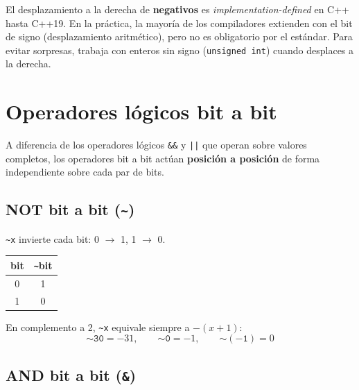 \documentclass[12pt, oneside]{article}
\begin{document}
\begin{advertencia}
  El desplazamiento a la derecha de \textbf{negativos} es
  \textit{implementation-defined} en C++ hasta C++19.
  En la práctica, la mayoría de los compiladores extienden con el bit de
  signo (desplazamiento aritmético), pero no es obligatorio por el estándar.
  Para evitar sorpresas, trabaja con enteros sin signo (\texttt{unsigned int})
  cuando desplaces a la derecha.
\end{advertencia}

\section{Operadores lógicos bit a bit}

A diferencia de los operadores lógicos \texttt{\&\&} y \texttt{||} que
operan sobre valores completos, los operadores bit a bit actúan
\textbf{posición a posición} de forma independiente sobre cada par de bits.

\subsection{NOT bit a bit (\texttt{\textasciitilde})}

\texttt{\textasciitilde{}x} invierte cada bit: 0 $\to$ 1, 1 $\to$ 0.

\begin{center}
\begin{tabular}{cc}
  \toprule
  bit & \texttt{\textasciitilde}bit \\
  \midrule
  0 & 1 \\
  1 & 0 \\
  \bottomrule
\end{tabular}
\end{center}

\begin{recuerda}
  En complemento a 2, \texttt{\textasciitilde{}x} equivale siempre a $-(x+1)$:
  \[
    \mathtt{\sim 30} = -31, \qquad \mathtt{\sim 0} = -1, \qquad \mathtt{\sim(-1)} = 0
  \]
\end{recuerda}

\subsection{AND bit a bit (\texttt{\&})}
\end{document}
